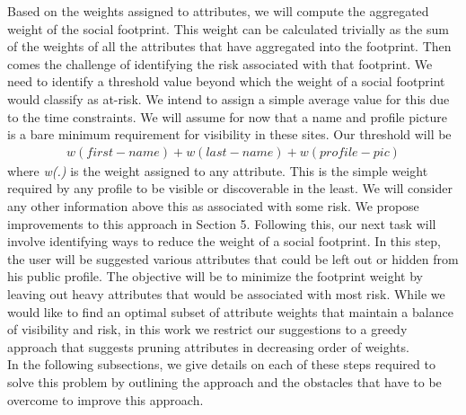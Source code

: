 \documentclass[10pt,conference]{IEEEtran}
\begin{document}
Based on the weights assigned to attributes, we will compute the aggregated weight of the social footprint. This weight can be calculated trivially as the sum of the weights of all the attributes that have aggregated into the footprint. Then comes the challenge of identifying the risk associated with that footprint. We need to identify a threshold value beyond which the weight of a social footprint would classify as at-risk. We intend to assign a simple average value for this due to the time constraints. We will assume for now that a name and profile picture is a bare minimum requirement for visibility in these sites. Our threshold will be 
\begin{align*}
w(first-name) + w(last-name) + w(profile-pic)
\end{align*}
where \textit{w(.)} is the weight assigned to any attribute. This is the simple weight required by any profile to be visible or discoverable in the least. We will consider any other information above this as associated with some risk. We propose improvements to this approach in Section 5. Following this, our next task will involve identifying ways to reduce the weight of a social footprint. In this step, the user will be suggested various attributes that could be left out or hidden from his public profile. The objective will be to minimize the footprint weight by leaving out heavy attributes that would be associated with most risk. While we would like to find an optimal subset of attribute weights that maintain a balance of visibility and risk, in this work we restrict our suggestions to a greedy approach that suggests pruning attributes in decreasing order of weights.\\

In the following subsections, we give details on each of these steps required to solve this problem by outlining the approach and the obstacles that have to be overcome to improve this approach.
\end{document}
